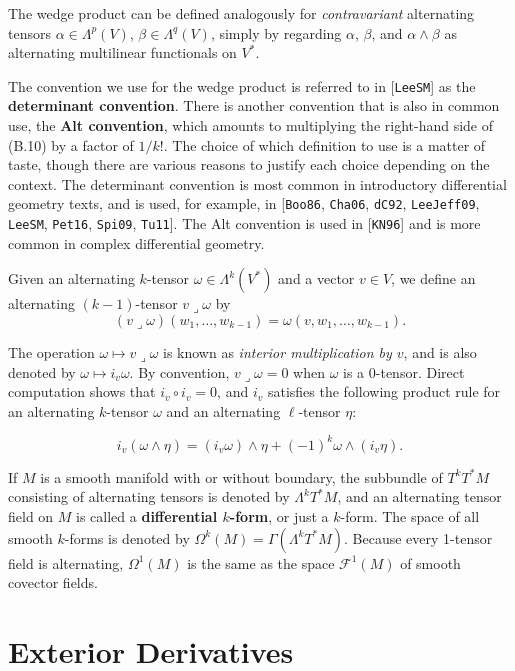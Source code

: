 The wedge product can be defined analogously for \emph{contravariant} alternating tensors $\alpha \in \Lambda^p(V)$, $\beta \in \Lambda^q(V)$, simply by regarding $\alpha$, $\beta$, and $\alpha \wedge \beta$ as alternating multilinear functionals on $V^*$.

The convention we use for the wedge product is referred to in [\texttt{LeeSM}] as the \textbf{determinant convention}. There is another convention that is also in common use, the \textbf{Alt convention}, which amounts to multiplying the right-hand side of (B.10) by a factor of $1/k!$. The choice of which definition to use is a matter of taste, though there are various reasons to justify each choice depending on the context. The determinant convention is most common in introductory differential geometry texts, and is used, for example, in [\texttt{Boo86}, \texttt{Cha06}, \texttt{dC92}, \texttt{LeeJeff09}, \texttt{LeeSM}, \texttt{Pet16}, \texttt{Spi09}, \texttt{Tu11}]. The Alt convention is used in [\texttt{KN96}] and is more common in complex differential geometry.

Given an alternating $k$-tensor $\omega \in \Lambda^k(V^*)$ and a vector $v \in V$, we define an alternating $(k-1)$-tensor $v \lrcorner \omega$ by
\[
(v \lrcorner \omega)(w_1,\ldots,w_{k-1}) = \omega(v,w_1,\ldots,w_{k-1}).
\]

The operation $\omega \mapsto v \lrcorner \omega$ is known as \emph{interior multiplication by $v$}, and is also denoted by $\omega \mapsto i_v\omega$. By convention, $v \lrcorner \omega = 0$ when $\omega$ is a 0-tensor. Direct computation shows that $i_v \circ i_v = 0$, and $i_v$ satisfies the following product rule for an alternating $k$-tensor $\omega$ and an alternating $\ell$-tensor $\eta$:

\begin{equation}
i_v(\omega \wedge \eta) = (i_v\omega) \wedge \eta + (-1)^k \omega \wedge (i_v\eta).
\tag{B.11}
\end{equation}

If $M$ is a smooth manifold with or without boundary, the subbundle of $T^k T^*M$ consisting of alternating tensors is denoted by $\Lambda^k T^* M$, and an alternating tensor field on $M$ is called a \textbf{differential $k$-form}, or just a $k$-form. The space of all smooth $k$-forms is denoted by $\Omega^k(M) = \Gamma(\Lambda^k T^* M)$. Because every 1-tensor field is alternating, $\Omega^1(M)$ is the same as the space $\mathcal{F}^1(M)$ of smooth covector fields.

\section{Exterior Derivatives}


